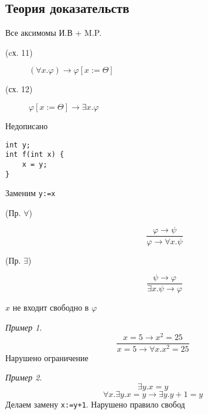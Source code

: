 \documentclass[english]{article}
\theoremstyle{plain}
\theoremstyle{remark}
\newtheorem*{examp}{Пример}
\theoremstyle{definition}
\begin{document}
\subsection{Теория доказательств}
\label{sec:org27148ee}
Все аксимомы И.В + M.P.
\begin{description}
\item[{(cх. 11)}] \((\forall x. \varphi) \to \varphi[x:=\Theta]\)
\item[{(сх. 12)}] \(\varphi[x:=\Theta]\to \exists x. \varphi\)
\end{description}
\color{red}Недописано\color{black}
\begin{verbatim}
int y;
int f(int x) {
	x = y;
}
\end{verbatim}
Заменим \texttt{y:=x}

\begin{description}
\item[{(Пр. \(\forall\))}] \[\frac{\varphi \to \psi}{\varphi \to \forall x. \psi}\]
\item[{(Пр. \(\exists\))}] \[ \frac{\psi \to \varphi}{\exists x.\psi \to \varphi} \]
\end{description}
\(x\) не входит свободно в \(\varphi\)
\begin{examp}
\[ \frac{x = 5 \to x^2 = 25}{x = 5 \to \forall x. x^2 = 25} \]
Нарушено ограничение
\end{examp}
\begin{examp}
\[ \exists y. x = y \]
\[ \forall x. \exists y. x = y \to \exists y. y + 1 = y \]
Делаем замену \texttt{x:=y+1}. Нарушено правило свобод
\end{examp}
\end{document}
